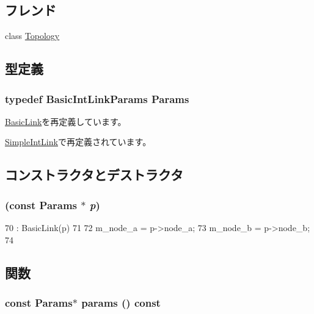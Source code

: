 \subsection*{フレンド}
\begin{DoxyCompactItemize}
\item 
class \hyperlink{classBasicIntLink_acd2b8699ab7559c0da687cd775e2c778}{Topology}
\end{DoxyCompactItemize}


\subsection{型定義}
\hypertarget{classBasicIntLink_a22036d2d68b49d72b25678790aae2c9e}{
\subsubsection[{Params}]{\setlength{\rightskip}{0pt plus 5cm}typedef BasicIntLinkParams {\bf Params}}}
\label{classBasicIntLink_a22036d2d68b49d72b25678790aae2c9e}


\hyperlink{classBasicLink_a2c371814143f1675a601e935bfbd756c}{BasicLink}を再定義しています。

\hyperlink{classSimpleIntLink_a16df42348b8967c4cc4aa2b9c9fafdf9}{SimpleIntLink}で再定義されています。

\subsection{コンストラクタとデストラクタ}
\hypertarget{classBasicIntLink_a2cb2526aa9f51c88e4ef6ff356c8a866}{
\subsubsection[{BasicIntLink}]{ (const {\bf Params} $\ast$ {\em p})}}
\label{classBasicIntLink_a2cb2526aa9f51c88e4ef6ff356c8a866}



\begin{DoxyCode}
70     : BasicLink(p)
71 {
72     m_node_a = p->node_a;
73     m_node_b = p->node_b;
74 }
\end{DoxyCode}


\subsection{関数}
\hypertarget{classBasicIntLink_acd3c3feb78ae7a8f88fe0f110a718dff}{
\subsubsection[{params}]{\setlength{\rightskip}{0pt plus 5cm}const {\bf Params}$\ast$ params () const}}
\label{classBasicIntLink_acd3c3feb78ae7a8f88fe0f110a718dff}


